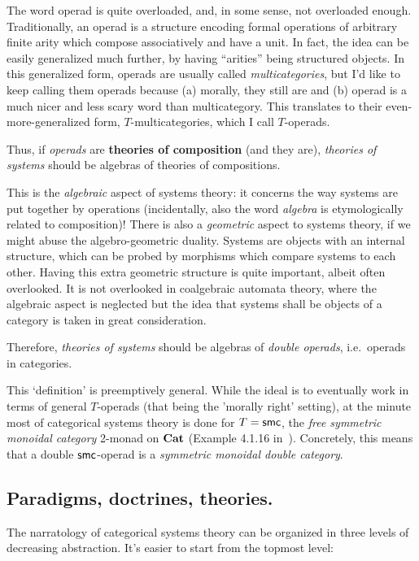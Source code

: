 \begin{remark}
	The word operad is quite overloaded, and, in some sense, not overloaded enough.
	Traditionally, an operad is a structure encoding formal operations of arbitrary finite arity which compose associatively and have a unit. In fact, the idea can be easily generalized much further, by having ``arities'' being structured objects.
	In this generalized form, operads are usually called \emph{multicategories}, but I'd like to keep calling them operads because (a) morally, they still are and (b) operad is a much nicer and less scary word than multicategory.
	This translates to their even-more-generalized form, $T$-multicategories, which I call $T$-operads.
\end{remark}

Thus, if \emph{operads} are \textbf{theories of composition} (and they are), \emph{theories of systems} should be algebras of theories of compositions.

This is the \emph{algebraic} aspect of systems theory: it concerns the way systems are put together by operations (incidentally, also the word \emph{algebra} is etymologically related to composition)!
There is also a \emph{geometric} aspect to systems theory, if we might abuse the algebro-geometric duality.
Systems are objects with an internal structure, which can be probed by morphisms which compare systems to each other.
Having this extra geometric structure is quite important, albeit often overlooked. It is not overlooked in coalgebraic automata theory, where the algebraic aspect is neglected but the idea that systems shall be objects of a category is taken in great consideration.

Therefore, \emph{theories of systems} should be algebras of \emph{double operads}, i.e.~operads in categories.

\begin{remark}
	This `definition' is preemptively general.
	While the ideal is to eventually work in terms of general $T$-operads (that being the 'morally right' setting), at the minute  most of categorical systems theory is done for $T = {\sf smc}$, the \emph{free symmetric monoidal category} 2-monad on $\Cat$ (Example 4.1.16 in~\cite{leinster_higher_2004}).
	Concretely, this means that a double ${\sf smc}$-operad is a \emph{symmetric monoidal double category}.
\end{remark}

\subsection{Paradigms, doctrines, theories.}
The narratology of categorical systems theory can be organized in three levels of decreasing abstraction.
It's easier to start from the topmost level:

